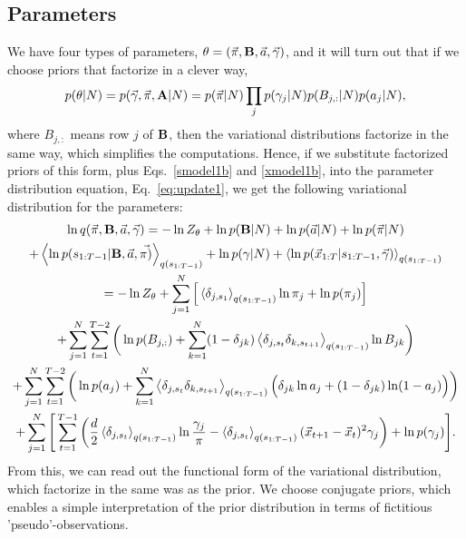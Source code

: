 \subsection{Parameters}
We have four types of parameters,
$\theta=(\vec\pi,\mathbf{B},\vec a,\vec \gamma)$, and it will turn out that
if we choose priors that factorize in a clever way,
\begin{equation}\label{pfactorization}
p(\theta|N)=p(\vec{\gamma},\vec{\pi},\mathbf{A}|N)
=p(\vec\pi|N)\prod_jp(\gamma_j|N)p(B_{j,:}|N)p(a_j|N),
\end{equation}
where $B_{j,:}$ means row $j$ of $\mathbf{B}$, then the variational
distributions factorize in the same way, which simplifies the
computations. Hence, if we substitute factorized priors of this form,
plus Eqs.~\eqref{smodel1b} and \eqref{xmodel1b}, into the parameter
distribution equation, Eq.~\eqref{eq:update1}, we get the following
variational distribution for the parameters:
\begin{multline}\label{Maverage}
  \ln q(\vec{\pi},\matris{B},\vec a,\vec{\gamma})=
  -\ln Z_\theta  
    +\ln p(\matris{B}|N)+\ln p(\vec{a}|N)+\ln p(\vec{\pi}|N)\\
    +\mean{\ln p(s_{1:T-1}|\matris{B},\vec a,\vec{\pi)}}_{q(s_{1:T-1})}
  +\ln p(\gamma|N)+\mean{\ln p(\x_{1:T}|s_{1:T-1},\vec{\gamma})}_{q(s_{1:T-1})}\\
  =-\ln Z_\theta 
  +\sum_{j=1}^N\Big[\mean{\delta_{j,s_1}}_{q(s_{1:T-1})}\ln\pi_j+\ln p(\pi_j)\Big]\\
  +\sum_{j=1}^N\sum_{t=1}^{T-2}\bigg(
  \ln p(B_{j,:})+\sum_{k=1}^N(1-\delta_{jk})
  \mean{\delta_{j,s_t}\delta_{k,s_{t+1}}}_{q(s_{1:T-1})}\ln B_{jk}
    \bigg)\\
  +\sum_{j=1}^N\sum_{t=1}^{T-2}\bigg(\ln p(a_j)
  +\sum_{k=1}^N\mean{\delta_{j,s_t}\delta_{k,s_{t+1}}}_{q(s_{1:T-1})}
  \Big(\delta_{jk}\ln a_j+(1-\delta_{jk})\ln (1-a_j)\Big)
    \bigg)\\%
  +\sum_{j=1}^N\Bigg[\sum_{t=1}^{T-1}
  \bigg(
  \frac d2\mean{\delta_{j,s_t}}_{q(s_{1:T-1})}\ln\frac{\gamma_j}{\pi}
  -\mean{\delta_{j,s_t}}_{q(s_{1:T-1})}(\x_{t+1}-\x_t)^2\gamma_j
  \bigg)+\ln p(\gamma_j)\Bigg].
\end{multline}
From this, we can read out the functional form of the variational
distribution, which factorize in the same was as the prior. We choose
conjugate priors\cite{Mackay1997,Beal2003}, which enables a simple
interpretation of the prior distribution in terms of fictitious
'pseudo'-observations.

